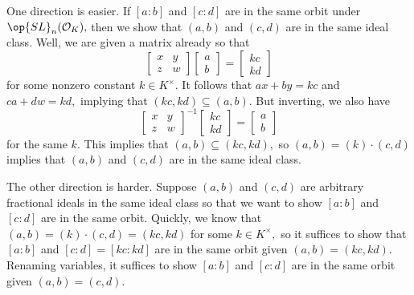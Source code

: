 One direction is easier. If $[a:b]$ and $[c:d]$ are in the same orbit under $\op{SL}_n(\mathcal O_K),$ then we show that $(a,b)$ and $(c,d)$ are in the same ideal class. Well, we are given a matrix already so that
\[\begin{bmatrix}
    x & y \\
    z & w
\end{bmatrix}\begin{bmatrix} a \\ b \end{bmatrix} = \begin{bmatrix} kc \\ kd \end{bmatrix}\]
for some nonzero constant $k\in K^\times.$ It follows that $ax+by=kc$ and $ca+dw=kd,$ implying that $(kc,kd)\subseteq(a,b).$ But inverting, we also have
\[\begin{bmatrix}
    x & y \\
    z & w
\end{bmatrix}^{-1}\begin{bmatrix} kc \\ kd \end{bmatrix}=\begin{bmatrix} a \\ b \end{bmatrix}\]
for the same $k.$ This implies that $(a,b)\subseteq(kc,kd),$ so $(a,b)=(k)\cdot(c,d)$ implies that $(a,b)$ and $(c,d)$ are in the same ideal class.

The other direction is harder. Suppose $(a,b)$ and $(c,d)$ are arbitrary fractional ideals in the same ideal class so that we want to show $[a:b]$ and $[c:d]$ are in the same orbit. Quickly, we know that $(a,b)=(k)\cdot(c,d)=(kc,kd)$ for some $k\in K^\times,$ so it suffices to show that $[a:b]$ and $ [c:d]=[kc:kd]$ are in the same orbit given $(a,b)=(kc,kd).$ Renaming variables, it suffices to show $[a:b]$ and $[c:d]$ are in the same orbit given $(a,b)=(c,d).$

